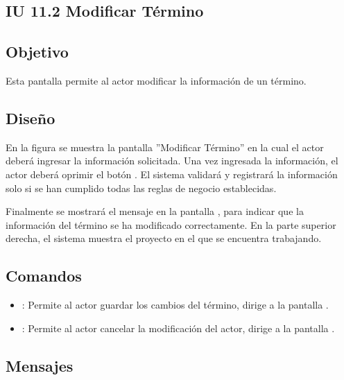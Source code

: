 \subsection{IU 11.2 Modificar Término}

\subsection{Objetivo}
	Esta pantalla permite al actor modificar la información de un término.
\subsection{Diseño}
	En la figura  se muestra la pantalla ''Modificar Término'' en la cual el actor deberá ingresar la información solicitada.
	Una vez ingresada la información, el actor deberá oprimir el botón  . El sistema validará y registrará la información solo si se han cumplido todas las reglas de negocio establecidas.
	
	Finalmente se mostrará el mensaje  en la pantalla , para indicar que la información del término se ha modificado correctamente.
	En la parte superior derecha, el sistema muestra el proyecto en el que se encuentra trabajando.

\subsection{Comandos}
\begin{itemize}
	\item {}: Permite al actor guardar los cambios del término, dirige a la pantalla .
	\item {}: Permite al actor cancelar la modificación del actor, dirige a la pantalla .
\end{itemize}

\subsection{Mensajes}

